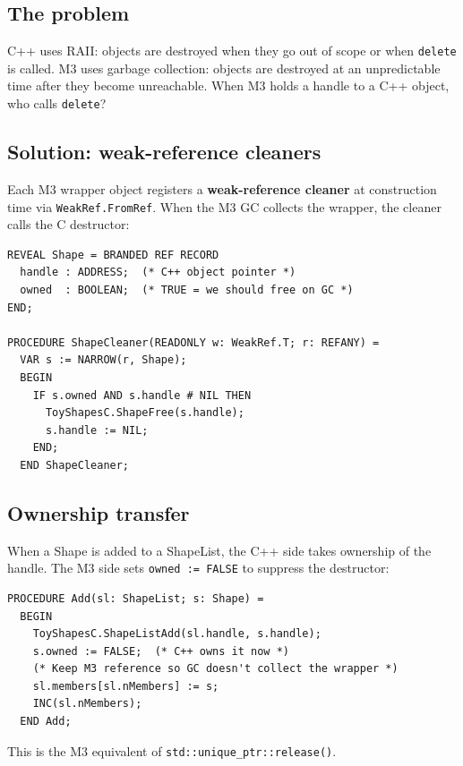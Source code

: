 \documentclass[11pt]{article}
\begin{document}
\subsection{The problem}

C++ uses RAII: objects are destroyed when they go out of scope or when
\texttt{delete} is called.  M3 uses garbage collection: objects are
destroyed at an unpredictable time after they become unreachable.
When M3 holds a handle to a C++ object, who calls \texttt{delete}?

\subsection{Solution: weak-reference cleaners}

Each M3 wrapper object registers a \textbf{weak-reference cleaner}
at construction time via \texttt{WeakRef.FromRef}.  When the M3 GC
collects the wrapper, the cleaner calls the C destructor:

\begin{lstlisting}
REVEAL Shape = BRANDED REF RECORD
  handle : ADDRESS;  (* C++ object pointer *)
  owned  : BOOLEAN;  (* TRUE = we should free on GC *)
END;

PROCEDURE ShapeCleaner(READONLY w: WeakRef.T; r: REFANY) =
  VAR s := NARROW(r, Shape);
  BEGIN
    IF s.owned AND s.handle # NIL THEN
      ToyShapesC.ShapeFree(s.handle);
      s.handle := NIL;
    END;
  END ShapeCleaner;
\end{lstlisting}

\subsection{Ownership transfer}

When a Shape is added to a ShapeList, the C++ side takes ownership
of the handle.  The M3 side sets \texttt{owned := FALSE} to
suppress the destructor:

\begin{lstlisting}
PROCEDURE Add(sl: ShapeList; s: Shape) =
  BEGIN
    ToyShapesC.ShapeListAdd(sl.handle, s.handle);
    s.owned := FALSE;  (* C++ owns it now *)
    (* Keep M3 reference so GC doesn't collect the wrapper *)
    sl.members[sl.nMembers] := s;
    INC(sl.nMembers);
  END Add;
\end{lstlisting}

This is the M3 equivalent of \texttt{std::unique\_ptr::release()}.

\end{document}
